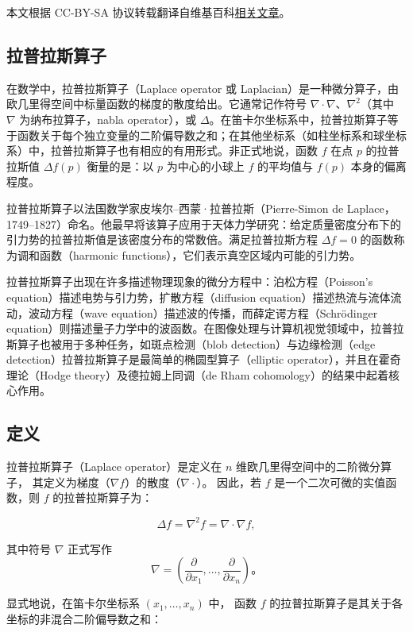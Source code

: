 
本文根据 CC-BY-SA 协议转载翻译自维基百科\href{https://en.wikipedia.org/wiki/Laplace_operator}{相关文章}。

\subsection{拉普拉斯算子}
在数学中，拉普拉斯算子（Laplace operator 或 Laplacian）是一种微分算子，由欧几里得空间中标量函数的梯度的散度给出。它通常记作符号 $\nabla \cdot \nabla$、$\nabla^{2}$（其中 $\nabla$ 为纳布拉算子，nabla operator），或 $\Delta$。在笛卡尔坐标系中，拉普拉斯算子等于函数关于每个独立变量的二阶偏导数之和；在其他坐标系（如柱坐标系和球坐标系）中，拉普拉斯算子也有相应的有用形式。非正式地说，函数 $f$ 在点 $p$ 的拉普拉斯值 $\Delta f(p)$ 衡量的是：以 $p$ 为中心的小球上 $f$ 的平均值与 $f(p)$ 本身的偏离程度。

拉普拉斯算子以法国数学家皮埃尔–西蒙·拉普拉斯（Pierre-Simon de Laplace，1749–1827）命名。他最早将该算子应用于天体力学研究：给定质量密度分布下的引力势的拉普拉斯值是该密度分布的常数倍。满足拉普拉斯方程 $\Delta f = 0$ 的函数称为调和函数（harmonic functions），它们表示真空区域内可能的引力势。

拉普拉斯算子出现在许多描述物理现象的微分方程中：泊松方程（Poisson’s equation）描述电势与引力势，扩散方程（diffusion equation）描述热流与流体流动，波动方程（wave equation）描述波的传播，而薛定谔方程（Schrödinger equation）则描述量子力学中的波函数。在图像处理与计算机视觉领域中，拉普拉斯算子也被用于多种任务，如斑点检测（blob detection）与边缘检测（edge detection）拉普拉斯算子是最简单的椭圆型算子（elliptic operator），并且在霍奇理论（Hodge theory）及德拉姆上同调（de Rham cohomology）的结果中起着核心作用。
\subsection{定义}
拉普拉斯算子（Laplace operator）是定义在 $n$ 维欧几里得空间中的二阶微分算子，
其定义为梯度（$\nabla f$）的散度（$\nabla \cdot$）。
因此，若 $f$ 是一个二次可微的实值函数，则 $f$ 的拉普拉斯算子为：

\[
\Delta f = \nabla^{2} f = \nabla \cdot \nabla f,
\tag{1}
\]

其中符号 $\nabla$ 正式写作
\[
\nabla = \left( \frac{\partial}{\partial x_{1}}, \ldots, \frac{\partial}{\partial x_{n}} \right)。
\]

显式地说，在笛卡尔坐标系 $(x_{1}, \ldots, x_{n})$ 中，
函数 $f$ 的拉普拉斯算子是其关于各坐标的非混合二阶偏导数之和：

